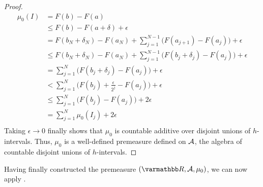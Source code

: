 \begin{proof}
                \begin{equation*}
                \begin{split}
                    \mu_0(I)
                    & = F(b) - F(a) \\
                    & \leq F(b) - F(a+\delta) + \epsilon \\
                    & = F(b_N + \delta_N) - F(a_N) + \sum_{j = 1}^{N-1} \bigl(F(a_{j+1}) - F(a_j)\bigr) + \epsilon \\
                    & \leq F(b_N + \delta_N) - F(a_N) + \sum_{j = 1}^{N-1} \bigl(F(b_j + \delta_j) - F(a_j)\bigr) + \epsilon \\
                    & = \sum_{j = 1}^{N} \bigl(F(b_j + \delta_j) - F(a_j)\bigr) + \epsilon \\
                    & < \sum_{j = 1}^{N} \bigl(F(b_j) + \frac{\epsilon}{2^j} - F(a_j)\bigr) + \epsilon \\
                    & \leq \sum_{j = 1}^N \bigl(F(b_j) - F(a_j)\bigr) + 2 \epsilon \\
                    & = \sum_{j = 1}^N \mu_0(I_j) + 2 \epsilon \\
                \end{split}
                \end{equation*}
            Taking $\epsilon \rightarrow 0$ finally shows that $\mu_0$ is countable additive over disjoint unions of $h$-intervals. Thus, $\mu_0$ is a well-defined premeasure defined on $\mathcal{A}$, the algebra of countable disjoint unions of $h$-intervals.
        \end{proof}

    Having finally constructed the premeasure $(\bfR, \cA, \mu_0)$, we can now apply .

